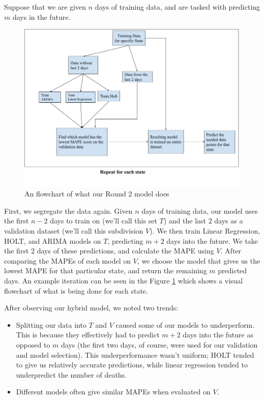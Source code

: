 \documentclass[sigconf,nonacm]{acmart}
\begin{document}
Suppose that we are given $n$ days of training data, and are tasked with
predicting $m$ days in the future. 

\begin{figure}
  \centering
  \includegraphics[width=\linewidth]{figures/Final_model.jpg}
  \caption{An flowchart of what our Round 2 model does}
  \label{fig:model_final}
\end{figure}

First, we segregate the data again. Given $n$ days of training data, our model
uses the first $n-2$ days to train on (we'll call this set $T$) and the last
$2$ days as a validation dataset (we'll call this subdivision $V$). We then
train Linear Regression, HOLT, and ARIMA models on $T$, predicting $m+2$ days
into the future. We take the first $2$ days of these predictions, and calculate
the MAPE using $V$. After comparing the MAPEs of each model on $V$, we choose
the model that gives us the lowest MAPE for that particular state, and return
the remaining $m$ predicted days. An example iteration can be seen in the 
Figure \ref{fig:model_final} which shows a visual flowchart of what is being done
for each state.

After observing our hybrid model, we noted two trends: 
\begin{itemize}
\item 
Splitting our data into $T$ and $V$ caused some of our models to
underperform. This is because they effectively had to predict $m+2$ days into
the future as opposed to $m$ days (the first two days, of course, were used for
our validation and model selection). This underperformance wasn't uniform;
HOLT tended to give us relatively accurate predictions, while linear regression
tended to underpredict the number of deaths. 
\item
Different models often give similar MAPEs when evaluated on $V$. 
\end{itemize}
\end{document}

